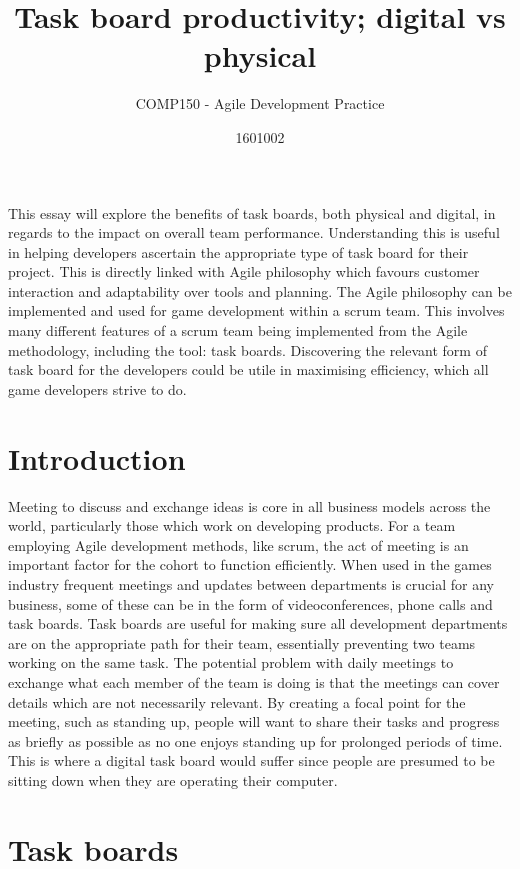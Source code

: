\documentclass{scrartcl}
\title{Task board productivity; digital vs physical}
\subtitle{COMP150 - Agile Development Practice}
\author{1601002}
\begin{document}
\maketitle


This essay will explore the benefits of task boards, both physical and digital, in regards to the impact on overall team performance. Understanding this is useful in helping developers ascertain the appropriate type of task board for their project. This is directly linked with Agile philosophy which favours customer interaction and adaptability over tools and planning.
The Agile philosophy can be implemented and used for game development within a scrum team. This involves many different features of a scrum team being implemented from the Agile methodology, including the tool: task boards. Discovering the relevant form of task board for the developers could be utile in maximising efficiency, which all game developers strive to do.

\section{Introduction}

Meeting to discuss and exchange ideas is core in all business models across the world, particularly those which work on developing products. For a team employing Agile development methods, like scrum, the act of meeting is an important factor for the cohort to function efficiently.
When used in the games industry frequent meetings and updates between departments is crucial for any business, some of these can be in the form of videoconferences, phone calls and task boards.
Task boards are useful for making sure all development departments are on the appropriate path for their team, essentially preventing two teams working on the same task\cite{esbensen2015dboard}. The potential problem with daily meetings to exchange what each member of the team is doing is that the meetings can cover details which are not necessarily relevant. By creating a focal point for the meeting, such as standing up, people will want to share their tasks and progress as briefly as possible as no one enjoys standing up for prolonged periods of time. This is where a digital task board would suffer since people are presumed to be sitting down when they are operating their computer.

\section{Task boards}
\end{document}
